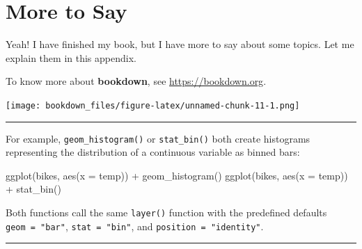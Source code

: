 \documentclass[
]{krantz}
\makeatletter
\newenvironment{Shaded}{\begin{snugshade}}{\end{snugshade}}
\newcommand{\AttributeTok}[1]{\textcolor[rgb]{0.61,0.61,0.61}{#1}}
\newcommand{\FunctionTok}[1]{\textcolor[rgb]{0,0,0}{#1}}
\newcommand{\NormalTok}[1]{#1}
\newcommand{\SpecialCharTok}[1]{\textcolor[rgb]{0,0,0}{#1}}
\newenvironment{kframe}{%
\medskip{}
\setlength{\fboxsep}{.8em}
 \def\at@end@of@kframe{}%
 \ifinner\ifhmode%
  \def\at@end@of@kframe{\end{minipage}}%
  \begin{minipage}{\columnwidth}%
 \fi\fi%
 \def\FrameCommand##1{\hskip\@totalleftmargin \hskip-\fboxsep
 \colorbox{shadecolor}{##1}\hskip-\fboxsep
     \hskip-\linewidth \hskip-\@totalleftmargin \hskip\columnwidth}%
 \MakeFramed {\advance\hsize-\width
   \@totalleftmargin\z@ \linewidth\hsize
   \@setminipage}}%
 {\par\unskip\endMakeFramed%
 \at@end@of@kframe}
\renewenvironment{Shaded}{\begin{kframe}}{\end{kframe}}
\makeatother
\begin{document}
\hypertarget{more-to-say}{%
\chapter{More to Say}\label{more-to-say}}

Yeah! I have finished my book, but I have more to say about some topics. Let me explain them in this appendix.

To know more about \textbf{bookdown}, see \url{https://bookdown.org}.

\texttt{[image: bookdown\_files/figure-latex/unnamed-chunk-11-1.png]}

\begin{center}\rule{0.5\linewidth}{0.5pt}\end{center}

For example, \texttt{geom\_histogram()} or \texttt{stat\_bin()} both create histograms representing the distribution of a continuous variable as binned bars:

\begin{Shaded}
\begin{Highlighting}[]
\FunctionTok{ggplot}\NormalTok{(bikes, }\FunctionTok{aes}\NormalTok{(}\AttributeTok{x =}\NormalTok{ temp)) }\SpecialCharTok{+} \FunctionTok{geom\_histogram}\NormalTok{() }
\FunctionTok{ggplot}\NormalTok{(bikes, }\FunctionTok{aes}\NormalTok{(}\AttributeTok{x =}\NormalTok{ temp)) }\SpecialCharTok{+} \FunctionTok{stat\_bin}\NormalTok{()}
\end{Highlighting}
\end{Shaded}

Both functions call the same \texttt{layer()} function with the predefined defaults \texttt{geom\ =\ "bar"}, \texttt{stat\ =\ "bin"}, and \texttt{position\ =\ "identity"}.

\begin{center}\rule{0.5\linewidth}{0.5pt}\end{center}

  

\backmatter
\printindex
\end{document}
